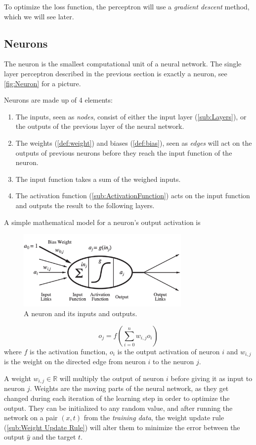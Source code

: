 \documentclass{article}
\begin{document}
 To optimize the loss function, the perceptron will use a \textit{gradient descent} method, which we will see later.
 \subsection{Neurons}%
  \label{sub:Neurons}
The neuron is the smallest computational unit of a neural network. The single layer perceptron described in the previous section is exactly a neuron, see \autoref{fig:Neuron} for a picture.  
\begin{definition}[Neurons]
  Neurons are made up of 4 elements: 
  \begin{enumerate}
    \item The inputs, seen as \textit{nodes}, consist of either the input layer (\autoref{sub:Layers}), or the outputs of the previous layer of the neural network. 
    \item The weights (\autoref{def:weight}) and biases (\autoref{def:bias}), seen as \textit{edges} will act on the outputs of previous neurons before they reach the input function of the neuron. 
    \item The input function takes a sum of the weighed inputs. 
    \item The activation function (\autoref{sub:ActivationFunction}) acts on the input function and outputs the result to the following layers. 
  \end{enumerate}
   A simple mathematical model for a neuron's output activation is \citep{book:AIModernApp}
  \begin{figure}
    \centering
    \includegraphics[width=0.75\textwidth]{Neuron}
    \caption{A neuron and its inputs and outputs.}
    \label{fig:Neuron}
  \end{figure}
  $$o_j = f \left( \sum^{n}_{i=0}w_{i,j} o_i  \right)$$
  where $f$ is the activation function, $o_i$ is the output activation of neuron $i$ and $w_{i,j}$ is the weight on the directed edge from neuron $i$ to the neuron $j$. 
\end{definition}
\begin{definition}[Weights]\label{def:weight}
  A weight $w_{i,j} \in \mathbb{R}$ will multiply the output of neuron $i$ before giving it as input to neuron $j$. Weights are the moving parts of the neural network, as they get changed during each iteration of the learning step in order to optimize the output. They can be initialized to any random value, and after running the network on a pair $(x,t)$ from the \textit{training data}, the weight update rule (\autoref{sub:Weight Update Rule}) will alter them to minimize the error between the output $\hat y$ and the target $t.$ 
\end{definition}
\end{document}
